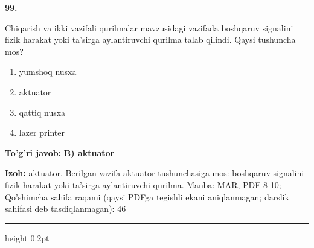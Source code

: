 \documentclass[10pt,a4paper]{article}
\begin{document}
{\bfseries\sffamily\color{ink} 99.}
\par
Chiqarish va ikki vazifali qurilmalar mavzusidagi vazifada boshqaruv signalini fizik harakat yoki ta'sirga aylantiruvchi qurilma talab qilindi. Qaysi tushuncha mos?
\begin{enumerate}[label=\Alph*),leftmargin=9mm]
\item yumshoq nusxa
\item aktuator
\item qattiq nusxa
\item lazer printer
\end{enumerate}
\begin{tcolorbox}[enhanced,breakable,colback=teal!4,colframe=teal!60!black,boxrule=0.45pt,arc=1.2mm,left=2.7mm,right=2.7mm,top=1.8mm,bottom=1.8mm,before skip=2mm,after skip=2mm]
{\bfseries\sffamily\color{teal}To'g'ri javob:} \textbf{B) aktuator}
\par\smallskip
{\bfseries Izoh:} aktuator. Berilgan vazifa aktuator tushunchasiga mos: boshqaruv signalini fizik harakat yoki ta'sirga aylantiruvchi qurilma. Manba: MAR, PDF 8-10; Qo'shimcha sahifa raqami (qaysi PDFga tegishli ekani aniqlanmagan; darslik sahifasi deb tasdiqlanmagan): 46
\end{tcolorbox}
\vspace{2mm}\hrule height 0.2pt\vspace{3mm}
\end{document}
